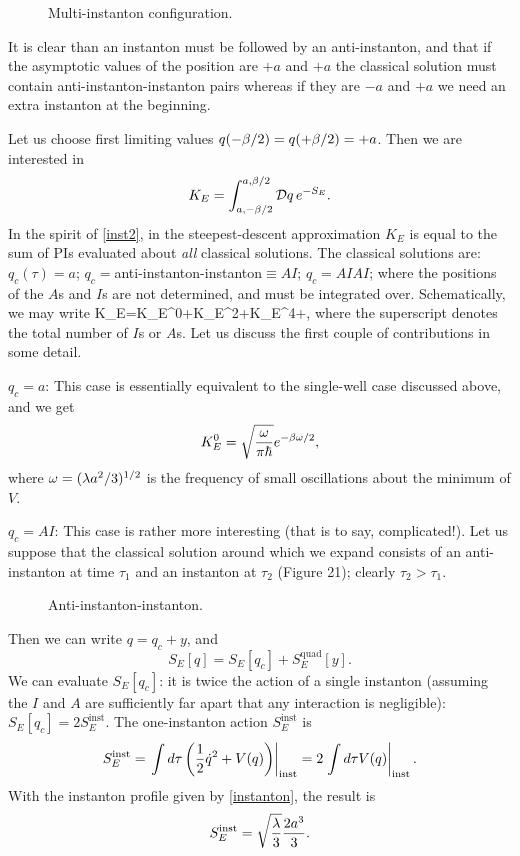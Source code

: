 \documentclass[12pt]{article}
\begin{document}
\begin{figure}[hb]
\epsfysize=5cm
\centerline{}
\caption{Multi-instanton configuration.}
\end{figure}


It is clear than an instanton must be followed by an anti-instanton,
and that if the asymptotic values of the position are $+a$ and $+a$
the classical solution must contain anti-instanton-instanton pairs
whereas if they are $-a$ and $+a$ we need an extra instanton at the
beginning.

Let us choose first limiting values $q(-{\beta}/2)=q(+{\beta}/2)=+a$. Then we
are interested in
\[
K_E=\int_{a,-\be/2}^{a,\be/2}\DD q\,e^{-S_E}.
\]
In the spirit of \eqref{inst2}, in the steepest-descent approximation
$K_E$ is equal to the sum of PIs evaluated about
{\em all} classical solutions. The classical solutions are:
$q_c(\tau)=a$;
$q_c=$anti-instanton-instanton$\equiv AI$; $q_c=AIAI$; \etcc where the
positions of the $A$s and $I$s are not determined, and must be
integrated over. Schematically, we may write
\beq
K_E=K_E^0+K_E^2+K_E^4+\cdots,
\label{new3}
\eeq
where the superscript denotes the
total number of $I$s or $A$s. Let us discuss the first couple of
contributions in some detail.

\noindent $q_c=a$: This case is essentially equivalent to the
single-well case discussed above, and we get
\[
K_E^0=\sqrt{{\omega}\over\pi\hbar}e^{-{\beta}{\omega}/2},
\]
where ${\omega}=(\lambda a^2/3)^{1/2}$ is the frequency of small oscillations
about the minimum of $V$.

\noindent $q_c=AI$: This case is rather more interesting (that is to
say, complicated!). Let us suppose that the classical solution around
which we expand consists of an anti-instanton at time $\tau_1$ and an
instanton at $\tau_2$ (Figure 21); clearly $\tau_2>\tau_1$.

\begin{figure}[hb]
\epsfysize=5cm
\centerline{}
\caption{Anti-instanton-instanton.}
\end{figure}


Then we can write $q=q_c+y$, and
\[
S_E[q]=S_E[q_c]+S_E^{\mathrm{quad}}[y].
\]
We can evaluate $S_E[q_c]$: it is twice the action of a single
instanton (assuming the $I$ and $A$ are sufficiently far apart that any
interaction is negligible): $S_E[q_c]=2S_E^{\mathrm{inst}}$. The
one-instanton action $S_E^{\mathrm{inst}}$ is
\[
S_E^{\mathrm{inst}}
=\left.\int d\tau\left({\frac 12}{\dot q}^2+V(q)\right)
\right|_{\mathrm{inst}}=2\left.
\int d\tau V(q)\right|_{\mathrm{inst}}.
\]
With the instanton profile given by \eqref{instanton}, the result is
\[
S_E^{\mathrm{inst}}=\sqrt{\lambda\over3}{2a^3\over3}.
\]
\end{document}
